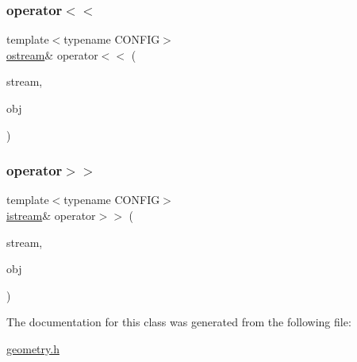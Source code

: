 \subsubsection{\texorpdfstring{operator$<$$<$}{operator<<}}
{\footnotesize\ttfamily template$<$typename C\+O\+N\+F\+IG$>$ \\
\hyperlink{classmui_1_1ostream}{ostream}\& operator$<$$<$ (\begin{DoxyParamCaption}\item[{\hyperlink{classmui_1_1ostream}{ostream} \&}]{stream,  }\item[{const \hyperlink{classmui_1_1geometry_1_1any__shape}{any\+\_\+shape}$<$ C\+O\+N\+F\+IG $>$ \&}]{obj }\end{DoxyParamCaption})\hspace{0.3cm}{\ttfamily [friend]}}

\mbox{\label{classmui_1_1geometry_1_1any__shape_ab8882ff239d9c3dde4576f36f949e500}} 
\subsubsection{\texorpdfstring{operator$>$$>$}{operator>>}}
{\footnotesize\ttfamily template$<$typename C\+O\+N\+F\+IG$>$ \\
\hyperlink{classmui_1_1istream}{istream}\& operator$>$$>$ (\begin{DoxyParamCaption}\item[{\hyperlink{classmui_1_1istream}{istream} \&}]{stream,  }\item[{\hyperlink{classmui_1_1geometry_1_1any__shape}{any\+\_\+shape}$<$ C\+O\+N\+F\+IG $>$ \&}]{obj }\end{DoxyParamCaption})\hspace{0.3cm}{\ttfamily [friend]}}



The documentation for this class was generated from the following file\+:\begin{DoxyCompactItemize}
\item 
\hyperlink{geometry_8h}{geometry.\+h}\end{DoxyCompactItemize}
